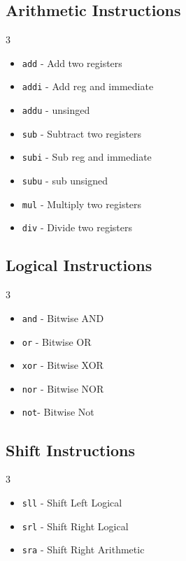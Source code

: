 \subsection{Arithmetic Instructions}
\begin{multicols}{3}
   \begin{itemize}[parsep=0pt]
      \item \texttt{add} - Add two registers
      \item \texttt{addi} - Add reg and immediate
      \item \texttt{addu} - unsinged
      \item \texttt{sub} - Subtract two registers
      \item \texttt{subi} - Sub reg and immediate
      \item \texttt{subu} - sub unsigned
      \item \texttt{mul} - Multiply two registers
      \item \texttt{div} - Divide two registers
   \end{itemize}
\end{multicols}

\subsection{Logical Instructions}
\begin{multicols}{3}
   \begin{itemize}[parsep=0pt]
      \item \texttt{and} - Bitwise AND
      \item \texttt{or} - Bitwise OR
      \item \texttt{xor} - Bitwise XOR
      \item \texttt{nor} - Bitwise NOR
      \item \texttt{not}- Bitwise Not
   \end{itemize}
\end{multicols}

\subsection{Shift Instructions}
\begin{multicols}{3}
   \begin{itemize}[parsep=0pt]
      \item \texttt{sll} - Shift Left Logical
      \item \texttt{srl} - Shift Right Logical
      \item \texttt{sra} - Shift Right Arithmetic
   \end{itemize}
\end{multicols}

